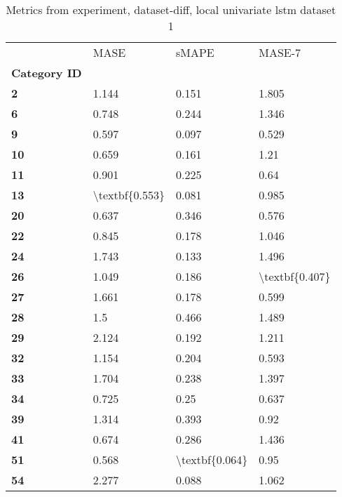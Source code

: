 \begin{table}[h]
\centering
\caption{Metrics from experiment, dataset-diff, local univariate lstm dataset 1}
\label{table:local-univariate-lstm-dataset-1-dataset-diff}
\begin{tabular}{llll}
\toprule
{} &            MASE &           sMAPE &          MASE-7 \\
\textbf{Category ID} &                 &                 &                 \\
\midrule
\textbf{2          } &           1.144 &           0.151 &           1.805 \\
\textbf{6          } &           0.748 &           0.244 &           1.346 \\
\textbf{9          } &           0.597 &           0.097 &           0.529 \\
\textbf{10         } &           0.659 &           0.161 &            1.21 \\
\textbf{11         } &           0.901 &           0.225 &            0.64 \\
\textbf{13         } &  \textbackslash textbf\{0.553\} &           0.081 &           0.985 \\
\textbf{20         } &           0.637 &           0.346 &           0.576 \\
\textbf{22         } &           0.845 &           0.178 &           1.046 \\
\textbf{24         } &           1.743 &           0.133 &           1.496 \\
\textbf{26         } &           1.049 &           0.186 &  \textbackslash textbf\{0.407\} \\
\textbf{27         } &           1.661 &           0.178 &           0.599 \\
\textbf{28         } &             1.5 &           0.466 &           1.489 \\
\textbf{29         } &           2.124 &           0.192 &           1.211 \\
\textbf{32         } &           1.154 &           0.204 &           0.593 \\
\textbf{33         } &           1.704 &           0.238 &           1.397 \\
\textbf{34         } &           0.725 &            0.25 &           0.637 \\
\textbf{39         } &           1.314 &           0.393 &            0.92 \\
\textbf{41         } &           0.674 &           0.286 &           1.436 \\
\textbf{51         } &           0.568 &  \textbackslash textbf\{0.064\} &            0.95 \\
\textbf{54         } &           2.277 &           0.088 &           1.062 \\
\bottomrule
\end{tabular}
\end{table}
